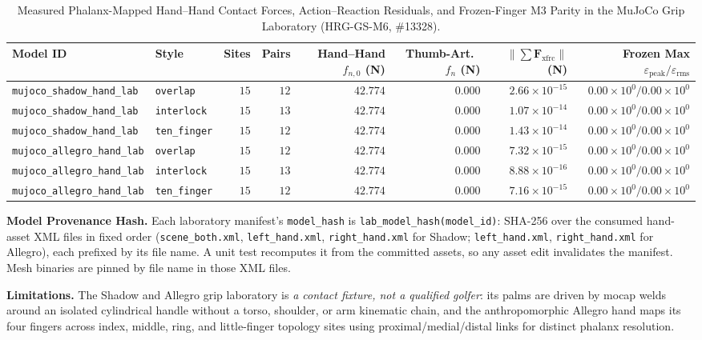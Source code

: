 \documentclass[11pt,a4paper]{article}
\begin{document}
\begin{table}[h!]
\centering
\caption{Measured Phalanx-Mapped Hand--Hand Contact Forces, Action--Reaction Residuals, and Frozen-Finger M3 Parity in the MuJoCo Grip Laboratory (HRG-GS-M6, \#13328).}
\label{tab:hrg-gs-m6-lab}
\small
\begin{tabular}{llrrrrrr}
\toprule
Model ID & Style & Sites & Pairs & Hand--Hand $f_{n,0}$ (N) & Thumb-Art.\ $f_n$ (N) & $\|\sum \mathbf{F}_{\mathrm{xfrc}}\|$ (N) & Frozen Max $\varepsilon_{\mathrm{peak}} / \varepsilon_{\mathrm{rms}}$ \\
\midrule
\texttt{mujoco\_shadow\_hand\_lab} & \texttt{overlap} & $15$ & $12$ & $42.774$ & $0.000$ & $2.66 \times 10^{-15}$ & $0.00 \times 10^{0} / 0.00 \times 10^{0}$ \\
\texttt{mujoco\_shadow\_hand\_lab} & \texttt{interlock} & $15$ & $13$ & $42.774$ & $0.000$ & $1.07 \times 10^{-14}$ & $0.00 \times 10^{0} / 0.00 \times 10^{0}$ \\
\texttt{mujoco\_shadow\_hand\_lab} & \texttt{ten\_finger} & $15$ & $12$ & $42.774$ & $0.000$ & $1.43 \times 10^{-14}$ & $0.00 \times 10^{0} / 0.00 \times 10^{0}$ \\
\texttt{mujoco\_allegro\_hand\_lab} & \texttt{overlap} & $15$ & $12$ & $42.774$ & $0.000$ & $7.32 \times 10^{-15}$ & $0.00 \times 10^{0} / 0.00 \times 10^{0}$ \\
\texttt{mujoco\_allegro\_hand\_lab} & \texttt{interlock} & $15$ & $13$ & $42.774$ & $0.000$ & $8.88 \times 10^{-16}$ & $0.00 \times 10^{0} / 0.00 \times 10^{0}$ \\
\texttt{mujoco\_allegro\_hand\_lab} & \texttt{ten\_finger} & $15$ & $12$ & $42.774$ & $0.000$ & $7.16 \times 10^{-15}$ & $0.00 \times 10^{0} / 0.00 \times 10^{0}$ \\
\bottomrule
\end{tabular}
\end{table}

\textbf{Model Provenance Hash.} Each laboratory manifest's \texttt{model\_hash} is \texttt{lab\_model\_hash(model\_id)}: SHA-256 over the consumed hand-asset XML files in fixed order (\texttt{scene\_both.xml}, \texttt{left\_hand.xml}, \texttt{right\_hand.xml} for Shadow; \texttt{left\_hand.xml}, \texttt{right\_hand.xml} for Allegro), each prefixed by its file name. A unit test recomputes it from the committed assets, so any asset edit invalidates the manifest. Mesh binaries are pinned by file name in those XML files.

\textbf{Limitations.}
The Shadow and Allegro grip laboratory is \emph{a contact fixture, not a qualified golfer}: its palms are driven by mocap welds around an isolated cylindrical handle without a torso, shoulder, or arm kinematic chain, and the anthropomorphic Allegro hand maps its four fingers across index, middle, ring, and little-finger topology sites using proximal/medial/distal links for distinct phalanx resolution.
\end{document}
